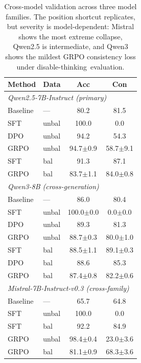 \documentclass[letterpaper]{article}
\begin{document}
\begin{table}[H]
\centering
\footnotesize
\begin{tabular}{llcc}
\toprule
\textbf{Method} & \textbf{Data} & \textbf{Acc} & \textbf{Con} \\
\midrule
\multicolumn{4}{l}{\textit{Qwen2.5-7B-Instruct (primary)}} \\
Baseline & --- & 80.2 & 81.5 \\
SFT & unbal & 100.0 & 0.0 \\
DPO & unbal & 94.2 & 54.3 \\
GRPO & unbal & 94.7{\scriptsize$\pm$0.9} & 58.7{\scriptsize$\pm$9.1} \\
SFT & bal & 91.3 & 87.1 \\
GRPO & bal & 83.7{\scriptsize$\pm$1.1} & 84.0{\scriptsize$\pm$0.8} \\
\midrule
\multicolumn{4}{l}{\textit{Qwen3-8B (cross-generation)}} \\
Baseline & --- & 86.0 & 80.4 \\
SFT & unbal & 100.0{\scriptsize$\pm$0.0} & 0.0{\scriptsize$\pm$0.0} \\
DPO & unbal & 89.3 & 81.3 \\
GRPO & unbal & 88.7{\scriptsize$\pm$0.3} & 80.0{\scriptsize$\pm$1.0} \\
SFT & bal & 88.5{\scriptsize$\pm$1.1} & 89.1{\scriptsize$\pm$0.3} \\
DPO & bal & 88.6 & 85.3 \\
GRPO & bal & 87.4{\scriptsize$\pm$0.8} & 82.2{\scriptsize$\pm$0.6} \\
\midrule
\multicolumn{4}{l}{\textit{Mistral-7B-Instruct-v0.3 (cross-family)}} \\
Baseline & --- & 65.7 & 64.8 \\
SFT & unbal & 100.0 & 0.0 \\
SFT & bal & 92.2 & 84.9 \\
GRPO & unbal & 98.4{\scriptsize$\pm$0.4} & 23.0{\scriptsize$\pm$3.6} \\
GRPO & bal & 81.1{\scriptsize$\pm$0.9} & 68.3{\scriptsize$\pm$3.6} \\
\bottomrule
\end{tabular}
\caption{Cross-model validation across three model families. The position shortcut replicates, but severity is model-dependent: Mistral shows the most extreme collapse, Qwen2.5 is intermediate, and Qwen3 shows the mildest GRPO consistency loss under \mbox{disable-thinking evaluation}.}
\label{tab:crossmodel}
\end{table}
\end{document}
